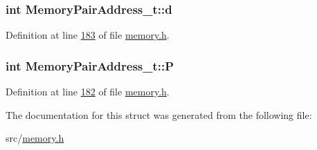 \subsubsection[{\texorpdfstring{d}{d}}]{\setlength{\rightskip}{0pt plus 5cm}int Memory\+Pair\+Address\+\_\+t\+::d}\hypertarget{structMemoryPairAddress__t_ad608e86288286889c2658e8043414edf}{}\label{structMemoryPairAddress__t_ad608e86288286889c2658e8043414edf}


Definition at line \hyperlink{memory_8h_source_l00183}{183} of file \hyperlink{memory_8h_source}{memory.\+h}.

\subsubsection[{\texorpdfstring{P}{P}}]{\setlength{\rightskip}{0pt plus 5cm}int Memory\+Pair\+Address\+\_\+t\+::P}\hypertarget{structMemoryPairAddress__t_a5bc11426b27565b959f280dd1a18b080}{}\label{structMemoryPairAddress__t_a5bc11426b27565b959f280dd1a18b080}


Definition at line \hyperlink{memory_8h_source_l00182}{182} of file \hyperlink{memory_8h_source}{memory.\+h}.



The documentation for this struct was generated from the following file\+:\begin{DoxyCompactItemize}
\item 
src/\hyperlink{memory_8h}{memory.\+h}\end{DoxyCompactItemize}
